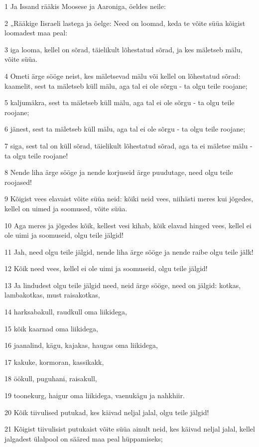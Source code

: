 \par 1 Ja Issand rääkis Moosese ja Aaroniga, öeldes neile:
\par 2 „Rääkige Iisraeli lastega ja öelge: Need on loomad, keda te võite süüa kõigist loomadest maa peal:
\par 3 iga looma, kellel on sõrad, täielikult lõhestatud sõrad, ja kes mäletseb mälu, võite süüa.
\par 4 Ometi ärge sööge neist, kes mäletsevad mälu või kellel on lõhestatud sõrad: kaamelit, sest ta mäletseb küll mälu, aga tal ei ole sõrgu - ta olgu teile roojane;
\par 5 kaljumäkra, sest ta mäletseb küll mälu, aga tal ei ole sõrgu - ta olgu teile roojane;
\par 6 jänest, sest ta mäletseb küll mälu, aga tal ei ole sõrgu - ta olgu teile roojane;
\par 7 siga, sest tal on küll sõrad, täielikult lõhestatud sõrad, aga ta ei mäletse mälu - ta olgu teile roojane!
\par 8 Nende liha ärge sööge ja nende korjuseid ärge puudutage, need olgu teile roojased!
\par 9 Kõigist vees elavaist võite süüa neid: kõiki neid vees, niihästi meres kui jõgedes, kellel on uimed ja soomused, võite süüa.
\par 10 Aga meres ja jõgedes kõik, kellest vesi kihab, kõik elavad hinged vees, kellel ei ole uimi ja soomuseid, olgu teile jälgid!
\par 11 Jah, need olgu teile jälgid, nende liha ärge sööge ja nende raibe olgu teile jälk!
\par 12 Kõik need vees, kellel ei ole uimi ja soomuseid, olgu teile jälgid!
\par 13 Ja lindudest olgu teile jälgid need, neid ärge sööge, need on jälgid: kotkas, lambakotkas, must raisakotkas,
\par 14 harksabakull, raudkull oma liikidega,
\par 15 kõik kaarnad oma liikidega,
\par 16 jaanalind, kägu, kajakas, haugas oma liikidega,
\par 17 kakuke, kormoran, kassikakk,
\par 18 öökull, puguhani, raisakull,
\par 19 toonekurg, haigur oma liikidega, vaenukägu ja nahkhiir.
\par 20 Kõik tiivulised putukad, kes käivad neljal jalal, olgu teile jälgid!
\par 21 Kõigist tiivulisist putukaist võite süüa ainult neid, kes käivad neljal jalal, kellel jalgadest ülalpool on sääred maa peal hüppamiseks;
